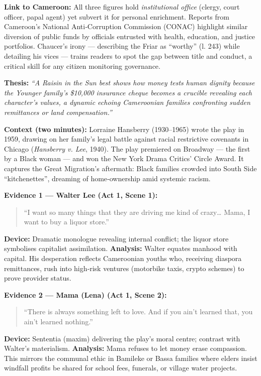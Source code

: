 \documentclass[11pt]{article}
\begin{document}
\begin{exemplebox}
\textbf{Link to Cameroon:} All three figures hold \emph{institutional office} (clergy, court officer, papal agent) yet subvert it for personal enrichment. Reports from Cameroon’s National Anti‑Corruption Commission (CONAC) highlight similar diversion of public funds by officials entrusted with health, education, and justice portfolios. Chaucer’s irony — describing the Friar as “worthy” (l. 243) while detailing his vices — trains readers to spot the gap between title and conduct, a critical skill for any citizen monitoring governance.
\end{exemplebox}

\begin{exemplebox}
\textbf{Thesis:} \emph{“A Raisin in the Sun best shows how money tests human dignity because the Younger family’s \$10,000 insurance cheque becomes a crucible revealing each character’s values, a dynamic echoing Cameroonian families confronting sudden remittances or land compensation.”}

\textbf{Context (two minutes):} Lorraine Hansberry (1930–1965) wrote the play in 1959, drawing on her family’s legal battle against racial restrictive covenants in Chicago (\emph{Hansberry v. Lee}, 1940). The play premiered on Broadway — the first by a Black woman — and won the New York Drama Critics’ Circle Award. It captures the Great Migration’s aftermath: Black families crowded into South Side “kitchenettes”, dreaming of home‑ownership amid systemic racism.

\textbf{Evidence 1 — Walter Lee (Act 1, Scene 1):} 
\begin{quote}
“I want so many things that they are driving me kind of crazy… Mama, I want to buy a liquor store.”
\end{quote}
\textbf{Device:} Dramatic monologue revealing internal conflict; the liquor store symbolises capitalist assimilation. 
\textbf{Analysis:} Walter equates manhood with capital. His desperation reflects Cameroonian youths who, receiving diaspora remittances, rush into high‑risk ventures (motorbike taxis, crypto schemes) to prove provider status.

\textbf{Evidence 2 — Mama (Lena) (Act 1, Scene 2):} 
\begin{quote}
“There is always something left to love. And if you ain’t learned that, you ain’t learned nothing.”
\end{quote}
\textbf{Device:} Sententia (maxim) delivering the play’s moral centre; contrast with Walter’s materialism. 
\textbf{Analysis:} Mama refuses to let money erase compassion. This mirrors the communal ethic in Bamileke or Bassa families where elders insist windfall profits be shared for school fees, funerals, or village water projects.


\end{exemplebox}
\end{document}

